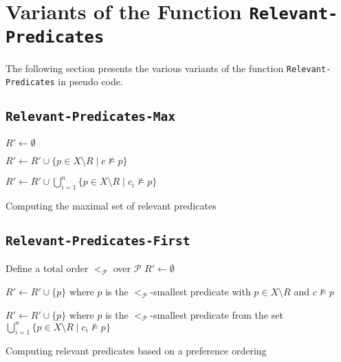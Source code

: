 
\section{Variants of the Function \texttt{Relevant-Predicates}}
The following section presents the various variants of the function \texttt{Relevant-} \texttt{Predicates} in pseudo code.

\subsection{\texttt{Relevant-Predicates-Max}}
\label{app:relevant-predicates-max}

\begin{algorithm}[H]
        
    {
    
        $R' \gets \emptyset$\;
    
        {
            $R' \gets R'\cup \{ p \in X \setminus R \mid c \not\models p \}$\;
        }
    
        {
            $R' \gets R'\cup \bigcup_{i = 1}^n \{ p \in X \setminus R \mid c_i \not\models p \}$\;
        }
     
        \;
    }
    
    \caption{Computing the maximal set of relevant predicates}
    \label{alg:relevant-predicates-max}
\end{algorithm}

\subsection{\texttt{Relevant-Predicates-First}}
\label{app:relevant-predicates-first}

\begin{algorithm}[H]

    {
    
        Define a total order $<_\mathcal P$ over $\mathcal P$\;
        $R' \gets \emptyset$\;
    
        {
            $R' \gets R'\cup \{ p \}$ where $p$ is the $<_\mathcal P$-smallest predicate with $p \in X \setminus R$ and $c \not\models p$\;
        }
    
        {
            $R' \gets R'\cup \{ p \}$ where $p$ is the $<_\mathcal P$-smallest predicate from the set $\bigcup_{i=1}^n \{ p \in X \setminus R \mid c_i \not\models p \}$\;
        }
     
        \;
    }
    
    \caption{Computing relevant predicates based on a preference ordering}
    \label{alg:relevant-predicates-first}
\end{algorithm}

